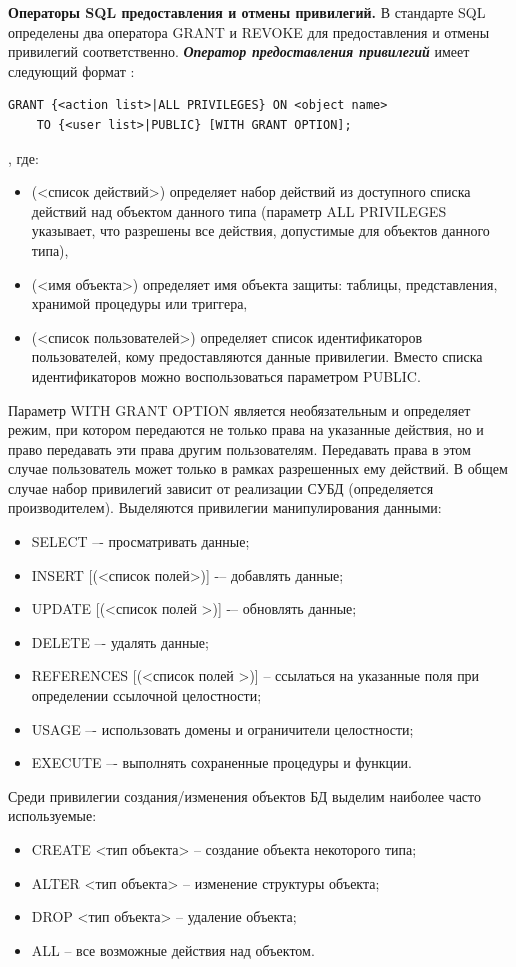 \textbf{Операторы SQL предоставления и отмены привилегий.} В стандарте SQL определены два оператора GRANT и 
REVOKE для предоставления и отмены привилегий соответственно. \textit{\textbf{Оператор предоставления привилегий}} 
имеет следующий формат \autocite{Skakun}:
\begin{lstlisting}[]
GRANT {<action list>|ALL PRIVILEGES} ON <object name>
    TO {<user list>|PUBLIC} [WITH GRANT OPTION];
\end{lstlisting}
, где:
\begin{itemize}
    \item <action list>(<список действий>) определяет набор действий из доступного списка действий над объектом 
    данного типа (параметр ALL PRIVILEGES указывает, что разрешены все действия, допустимые для объектов данного
    типа),
    \item <object name>(<имя объекта>) определяет имя объекта защиты: таблицы, представления, хранимой 
    процедуры или триггера,
    \item <user list>(<список пользователей>) определяет список идентификаторов пользователей, кому предоставляются 
    данные привилегии. Вместо списка идентификаторов можно воспользоваться параметром PUBLIC.
\end{itemize}
Параметр WITH GRANT OPTION является необязательным и определяет режим, при котором передаются не только права 
на указанные действия, но и право передавать эти права другим пользователям. Передавать права в этом случае 
пользователь может только в рамках разрешенных ему действий. В общем случае набор привилегий зависит от 
реализации СУБД (определяется производителем). Выделяются привилегии манипулирования данными:
\begin{itemize}
    \item SELECT –- просматривать данные;
    \item INSERT [(<список полей>)] -– добавлять данные;
    \item UPDATE [(<список полей >)] -– обновлять данные;
    \item DELETE –- удалять данные;
    \item REFERENCES [(<список полей >)] -- ссылаться на указанные поля при определении ссылочной целостности;
    \item USAGE –- использовать домены и ограничители целостности;
    \item EXECUTE –- выполнять сохраненные процедуры и функции.
\end{itemize}
Среди привилегии создания/изменения объектов БД выделим наиболее часто используемые:
\begin{itemize}
    \item CREATE <тип объекта> -- создание объекта некоторого типа;
    \item ALTER <тип объекта> -- изменение структуры объекта;
    \item DROP <тип объекта> -- удаление объекта;
    \item ALL -- все возможные действия над объектом.
\end{itemize}

